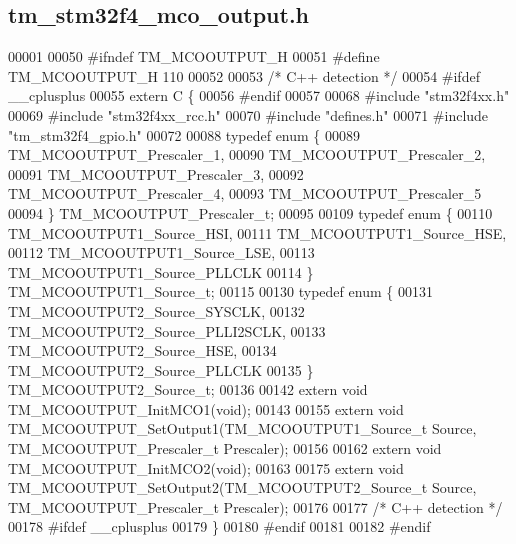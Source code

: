\hypertarget{tm__stm32f4__mco__output_8h_source}{}\subsection{tm\+\_\+stm32f4\+\_\+mco\+\_\+output.\+h}

\begin{DoxyCode}
00001 
00050 \textcolor{preprocessor}{#ifndef TM\_MCOOUTPUT\_H}
00051 \textcolor{preprocessor}{#define TM\_MCOOUTPUT\_H 110}
00052 
00053 \textcolor{comment}{/* C++ detection */}
00054 \textcolor{preprocessor}{#ifdef \_\_cplusplus}
00055 \textcolor{keyword}{extern} C \{
00056 \textcolor{preprocessor}{#endif}
00057 
00068 \textcolor{preprocessor}{#include "stm32f4xx.h"}
00069 \textcolor{preprocessor}{#include "stm32f4xx\_rcc.h"}
00070 \textcolor{preprocessor}{#include "defines.h"}
00071 \textcolor{preprocessor}{#include "tm\_stm32f4\_gpio.h"}
00072 
00088 \textcolor{keyword}{typedef} \textcolor{keyword}{enum} \{
00089     TM\_MCOOUTPUT\_Prescaler\_1,
00090     TM\_MCOOUTPUT\_Prescaler\_2,
00091     TM\_MCOOUTPUT\_Prescaler\_3,
00092     TM\_MCOOUTPUT\_Prescaler\_4,
00093     TM\_MCOOUTPUT\_Prescaler\_5
00094 \} TM\_MCOOUTPUT\_Prescaler\_t;
00095 
00109 \textcolor{keyword}{typedef} \textcolor{keyword}{enum} \{
00110     TM\_MCOOUTPUT1\_Source\_HSI,
00111     TM\_MCOOUTPUT1\_Source\_HSE,
00112     TM\_MCOOUTPUT1\_Source\_LSE,
00113     TM\_MCOOUTPUT1\_Source\_PLLCLK
00114 \} TM\_MCOOUTPUT1\_Source\_t;
00115 
00130 \textcolor{keyword}{typedef} \textcolor{keyword}{enum} \{
00131     TM\_MCOOUTPUT2\_Source\_SYSCLK,
00132     TM\_MCOOUTPUT2\_Source\_PLLI2SCLK,
00133     TM\_MCOOUTPUT2\_Source\_HSE,
00134     TM\_MCOOUTPUT2\_Source\_PLLCLK
00135 \} TM\_MCOOUTPUT2\_Source\_t;
00136 
00142 \textcolor{keyword}{extern} \textcolor{keywordtype}{void} TM\_MCOOUTPUT\_InitMCO1(\textcolor{keywordtype}{void});
00143 
00155 \textcolor{keyword}{extern} \textcolor{keywordtype}{void} TM\_MCOOUTPUT\_SetOutput1(TM\_MCOOUTPUT1\_Source\_t Source, TM\_MCOOUTPUT\_Prescaler\_t Prescaler);
00156 
00162 \textcolor{keyword}{extern} \textcolor{keywordtype}{void} TM\_MCOOUTPUT\_InitMCO2(\textcolor{keywordtype}{void});
00163  
00175 \textcolor{keyword}{extern} \textcolor{keywordtype}{void} TM\_MCOOUTPUT\_SetOutput2(TM\_MCOOUTPUT2\_Source\_t Source, TM\_MCOOUTPUT\_Prescaler\_t Prescaler);
00176 
00177 \textcolor{comment}{/* C++ detection */}
00178 \textcolor{preprocessor}{#ifdef \_\_cplusplus}
00179 \}
00180 \textcolor{preprocessor}{#endif}
00181 
00182 \textcolor{preprocessor}{#endif}
\end{DoxyCode}

